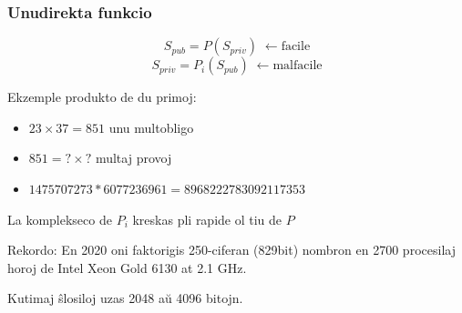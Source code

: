 \documentclass[utf8, aspectratio=169]{beamer}
\begin{document}
\begin{frame}
  \frametitle{Unudirekta funkcio}
  \[ S_{pub} = P(S_{priv}) \; \longleftarrow \text{facile}\]
  \[ S_{priv} = P_i(S_{pub}) \; \longleftarrow \text{malfacile}\]

  \pause
  \vspace{1em}
  Ekzemple produkto de du primoj:

  \pause
  \begin{itemize}
  \item $23 \times 37 = 851$ unu multobligo
  \item $851 = ? \times ?$ multaj provoj
  \item $1475707273*6077236961 = 8968222783092117353$
  \end{itemize}

  \pause
  La komplekseco de $P_i$ kreskas pli rapide ol tiu de $P$

  \pause
  \vspace{0.5em}
  Rekordo: En 2020 oni faktorigis 250-ciferan (829bit) nombron en 2700
  procesilaj horoj de Intel Xeon Gold 6130 at 2.1 GHz.

  \vspace{0.5em}
  Kutimaj ŝlosiloj uzas 2048 aŭ 4096 bitojn.
\end{frame}
\end{document}
